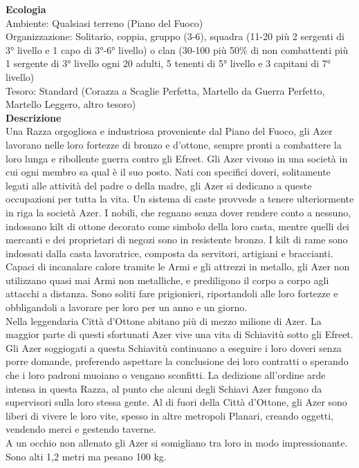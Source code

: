 \begin{multicols}{2}
\textbf{Ecologia}\\
Ambiente: Qualsiasi terreno (Piano del Fuoco)\\
Organizzazione: Solitario, coppia, gruppo (3-6), squadra (11-20 più 2 sergenti di 3° livello e 1 capo di 3°-6° livello) o clan (30-100 più 50\% di non combattenti più 1 sergente di 3° livello ogni 20 adulti, 5 tenenti di 5° livello e 3 capitani di 7° livello)\\
Tesoro: Standard (Corazza a Scaglie Perfetta, Martello da Guerra Perfetto, Martello Leggero, altro tesoro)\\
\textbf{Descrizione}\\
Una Razza orgogliosa e industriosa proveniente dal Piano del Fuoco, gli Azer lavorano nelle loro fortezze di bronzo e d'ottone, sempre pronti a combattere la loro lunga e ribollente guerra contro gli Efreet. Gli Azer vivono in una società in cui ogni membro sa qual è il suo posto. Nati con specifici doveri, solitamente legati alle attività del padre o della madre, gli Azer si dedicano a queste occupazioni per tutta la vita. Un sistema di caste provvede a tenere ulteriormente in riga la società Azer. I nobili, che regnano senza dover rendere conto a nessuno, indossano kilt di ottone decorato come simbolo della loro casta, mentre quelli dei mercanti e dei proprietari di negozi sono in resistente bronzo. I kilt di rame sono indossati dalla casta lavoratrice, composta da servitori, artigiani e braccianti.\\
Capaci di incanalare calore tramite le Armi e gli attrezzi in metallo, gli Azer non utilizzano quasi mai Armi non metalliche, e prediligono il corpo a corpo agli attacchi a distanza. Sono soliti fare prigionieri, riportandoli alle loro fortezze e obbligandoli a lavorare per loro per un anno e un giorno.\\
Nella leggendaria Città d'Ottone abitano più di mezzo milione di Azer. La maggior parte di questi sfortunati Azer vive una vita di Schiavitù sotto gli Efreet. Gli Azer soggiogati a questa Schiavitù continuano a eseguire i loro doveri senza porre domande, preferendo aspettare la conclusione dei loro contratti o sperando che i loro padroni muoiano o vengano sconfitti. La dedizione all'ordine arde intensa in questa Razza, al punto che alcuni degli Schiavi Azer fungono da supervisori sulla loro stessa gente. Al di fuori della Città d'Ottone, gli Azer sono liberi di vivere le loro vite, spesso in altre metropoli Planari, creando oggetti, vendendo merci e gestendo taverne.\\
A un occhio non allenato gli Azer si somigliano tra loro in modo impressionante. Sono alti 1,2 metri ma pesano 100 kg.\\



\end{multicols}

